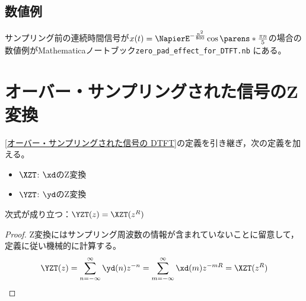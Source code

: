         \subsection{数値例}
            サンプリング前の連続時間信号が$x(t) = \NapierE^{-\frac{n^2}{800}}\cos\parens*{\frac{\pi n}{5}}$の場合の数値例がMathematicaノートブック\verb|zero_pad_effect_for_DTFT.nb| にある。
    \section{オーバー・サンプリングされた信号のZ変換}
        \ref{オーバー・サンプリングされた信号の DTFT}の定義を引き継ぎ，次の定義を加える。
        \begin{itemize}
            \item $\XZT$: $\xd$のZ変換
            \item $\YZT$: $\yd$のZ変換
        \end{itemize}
        \begin{shadebox}
            次式が成り立つ：$\YZT(z) = \XZT(z^R)$
        \end{shadebox}
        \begin{proof}
            Z変換にはサンプリング周波数の情報が含まれていないことに留意して，定義に従い機械的に計算する。
            \[ \YZT(z) = \sum_{n=-\infty}^\infty \yd(n)z^{-n} = \sum_{m=-\infty}^\infty \xd(m)z^{-mR} = \XZT(z^R) \]
        \end{proof}

